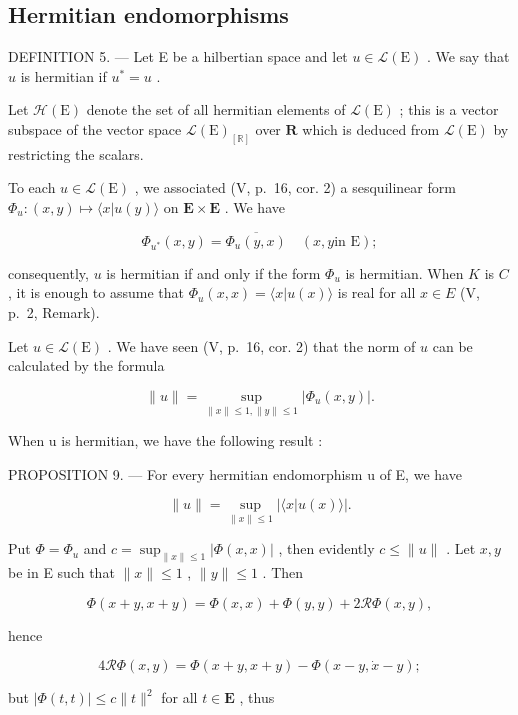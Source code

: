 \subsection{Hermitian endomorphisms}

DEFINITION 5. --- Let E be a hilbertian space and let \(u \in \mathcal{L}(\mathrm{E})\) . We say that \(u\) is hermitian if \(u^* = u\) .

Let \(\mathcal{H}(\mathrm{E})\) denote the set of all hermitian elements of \(\mathcal{L}(\mathrm{E})\) ; this is a vector subspace of the vector space \(\mathcal{L}(\mathrm{E})_{[\mathbb{R}]}\) over \(\mathbf{R}\) which is deduced from \(\mathcal{L}(\mathrm{E})\) by restricting the scalars.

To each \(u \in \mathcal{L}(\mathrm{E})\) , we associated (V, p.~16, cor. 2) a sesquilinear form \(\Phi_u : (x, y) \mapsto \langle x | u(y) \rangle\) on \(\mathbf{E} \times \mathbf{E}\) . We have

\[
\Phi_ {u ^ {*}} (x, y) = \overline {{{{\Phi_ {u} (y , x)}}}} \quad (x, y \text {in E});\tag{14}
\]

consequently, \(u\) is hermitian if and only if the form \(\Phi_u\) is hermitian. When \(K\) is \(C\) , it is enough to assume that \(\Phi_u(x, x) = \langle x | u(x) \rangle\) is real for all \(x \in E\) (V, p.~2, Remark).

Let \(u \in \mathcal{L}(\mathrm{E})\) . We have seen (V, p.~16, cor. 2) that the norm of \(u\) can be calculated by the formula

\[
\| u \| = \sup _ {\| x \| \leqslant 1, \| y \| \leqslant 1} \left| \Phi_ {u} (x, y) \right|.\tag{15}
\]

When u is hermitian, we have the following result :

PROPOSITION 9. --- For every hermitian endomorphism u of E, we have

\[
\| u \| = \sup _ {\| x \| \leqslant 1} | \langle x | u (x) \rangle |.\tag{16}
\]

Put \(\Phi = \Phi_{u}\) and \(c = \sup_{\| x\| \leqslant 1}|\Phi (x,x)|\) , then evidently \(c\leqslant \| u\|\) . Let \(x,y\) be in E such that \(\| x\| \leqslant 1\) , \(\| y\| \leqslant 1\) . Then

\[
\Phi (x + y, x + y) = \Phi (x, x) + \Phi (y, y) + 2 \mathscr {R} \Phi (x, y),
\]

hence

\[
4 \mathscr {R} \Phi (x, y) = \Phi (x + y, x + y) - \Phi (x - y, \dot {x} - y);
\]

but \(|\Phi(t, t)| \leqslant c \|t\|^2\) for all \(t \in \mathbf{E}\) , thus


